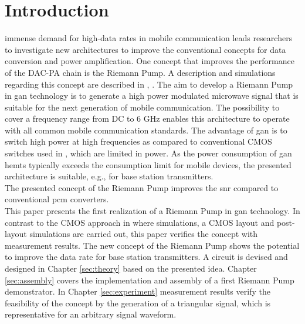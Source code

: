 \documentclass[journal]{IEEEtran}
\begin{document}
\section{Introduction}
\label{sec:introduction}
 immense demand for high-data rates in mobile communication leads researchers to investigate new architectures to improve the conventional concepts
for data conversion and power amplification.
One concept that improves the performance of the DAC-PA chain is the Riemann Pump.
A description and simulations regarding this concept are described in \cite{VeyracRivetDevalEtAl2014}, \cite{DevalRivetVeyrac2015}.
The aim to develop a Riemann Pump in \gls{gan} technology is to generate a high power modulated microwave signal that is suitable for the next generation of mobile communication.
The possibility to cover a frequency range from DC to 6 GHz enables this architecture to operate with all common mobile communication standards.
The advantage of \gls{gan} is to switch high power at high frequencies as compared to conventional CMOS switches used in \cite{VeyracRivetDevalEtAl2016}, which are limited in power.
As the power consumption of \gls{gan} \glspl{hemt} typically exceeds the consumption limit for mobile devices, the presented architecture is suitable, e.g., for base station transmitters.\\
The presented concept of the Riemann Pump improves the \gls{snr} compared to conventional \gls{pcm} converters.
\\
This paper presents the first realization of a Riemann Pump in \gls{gan} technology.
In contrast to the CMOS approach in \cite{VeyracRivetDevalEtAl2016} where simulations, a CMOS layout and post-layout simulations are carried out, this paper verifies the concept with measurement results.
The new concept of the Riemann Pump shows the potential to improve the data rate for base station transmitters.
A circuit is devised and designed in Chapter \ref{sec:theory} based on the presented idea.
Chapter \ref{sec:assembly} covers the implementation and assembly of a first Riemann Pump demonstrator.
In Chapter \ref{sec:experiment} measurement results verify the feasibility of the concept by the generation of a triangular signal, which is representative for an arbitrary signal waveform.
\end{document}
